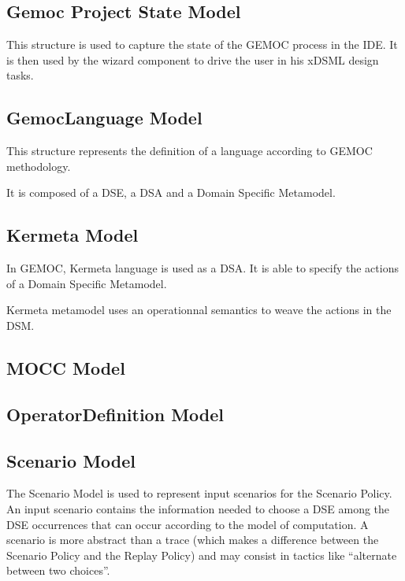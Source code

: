 \documentclass{gemoc} %
\begin{document}
\subsection{Gemoc Project State Model}
\label{sec:Gemoc_Project_State_Model}
This structure is used to capture the state of the GEMOC process in the IDE. It is then used by the wizard component to drive the user in his xDSML design tasks.

\subsection{GemocLanguage Model}
\label{sec:GemocLanguage_Model}
This structure represents the definition of a language according to GEMOC methodology.

It is composed of a DSE, a DSA and a Domain Specific Metamodel.


\subsection{Kermeta Model}
\label{sec:Kermeta_Model}
In GEMOC, Kermeta language is used as a DSA.
It is able to specify the actions of a Domain Specific Metamodel.

Kermeta metamodel uses an operationnal semantics to weave the actions in the DSM.

\subsection{MOCC Model}
\label{sec:MOCC_Model}

\subsection{OperatorDefinition Model}
\label{sec:OperatorDefinition_Model}


\subsection{Scenario Model}
\label{sec:Scenario_Model}
The Scenario Model is used to represent input scenarios for the Scenario Policy. An input scenario contains the information needed to choose a DSE among the DSE occurrences that can occur according to the model of computation. A scenario is more abstract than a trace (which makes a difference between the Scenario Policy and the Replay Policy) and may consist in tactics like ``alternate between two choices''.
\end{document}
